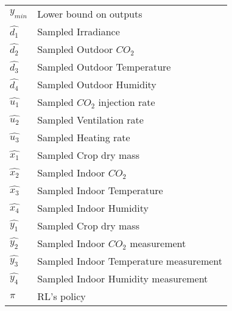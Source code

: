 \begin{longtable}{p{2.5cm}p{8cm}}
	$y_{min}$ & Lower bound on outputs \\
	$\hat{d_1}$ & Sampled Irradiance \\
	$\hat{d_2}$ & Sampled Outdoor $CO_2$ \\
	$\hat{d_3}$ & Sampled Outdoor Temperature \\
	$\hat{d_4}$ & Sampled Outdoor Humidity \\
	$\hat{u_1}$ & Sampled $CO_2$ injection rate \\
	$\hat{u_2}$ & Sampled Ventilation rate \\
	$\hat{u_3}$ & Sampled Heating rate \\
	$\hat{x_1}$ & Sampled Crop dry mass \\
	$\hat{x_2}$ & Sampled Indoor $CO_2$ \\
	$\hat{x_3}$ & Sampled Indoor Temperature \\
	$\hat{x_4}$ & Sampled Indoor Humidity \\
	$\hat{y_1}$ & Sampled Crop dry mass \\
	$\hat{y_2}$ & Sampled Indoor $CO_2$ measurement \\
	$\hat{y_3}$ & Sampled Indoor Temperature measurement \\
	$\hat{y_4}$ & Sampled Indoor Humidity measurement \\
	$\pi$ & RL's policy \\
	\bottomrule
\end{longtable}


